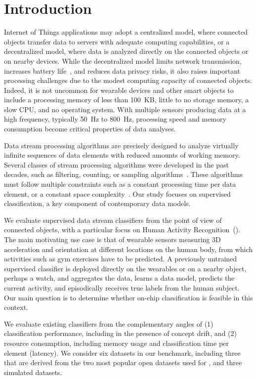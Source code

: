 \section{Introduction}
\label{sec:introduction}

Internet of Things applications may adopt a centralized model, where connected
objects transfer data to servers with adequate computing capabilities, or a
decentralized model, where data is analyzed directly on the connected objects or
on nearby devices. While the decentralized model limits network transmission,
increases battery life~\cite{sensor-network-survey, sensor-energy-model}, and
reduces data privacy risks, it also raises important processing challenges due
to the modest computing capacity of connected objects. Indeed, it is not
uncommon for wearable devices and other smart objects to include a processing
memory of less than 100~KB, little to no storage memory, a slow CPU, and no
operating system. With multiple sensors producing data at a high frequency,
typically 50~Hz to 800~Hz, processing speed and memory consumption become
critical properties of data analyses. 

Data stream processing algorithms are precisely designed to analyze virtually
infinite sequences of data elements with reduced amounts of working memory.
Several classes of stream processing algorithms were developed in the past
decades, such as filtering, counting, or sampling
algorithms~\cite{kejariwal2015}.  These algorithms must follow multiple
constraints such as a constant processing time per data element, or a constant space
complexity~\cite{issues_learning_from_stream}.  Our study focuses on supervised
classification, a key component of contemporary data models.

We evaluate supervised data stream classifiers from the point of view of
connected objects, with a particular focus on Human Activity Recognition~(\har). The main motivating use case
is that of wearable sensors measuring 3D acceleration and orientation at
different locations on the human body, from which activities such as gym
exercises have to be predicted. A previously untrained supervised classifier is
deployed directly on the wearables or on a nearby object, perhaps a watch, and
aggregates the data, learns a data model, predicts the current activity, and
episodically receives true labels from the human subject. Our main question is
to determine whether on-chip classification is feasible in this context. 

We evaluate existing classifiers from the complementary angles of (1)
classification performance, including in the presence of concept drift, and
(2) resource consumption, including memory usage and classification time
per element (latency). We consider six datasets in our benchmark, including
three that are derived from the two most popular open datasets used for \har, and
three simulated datasets.

